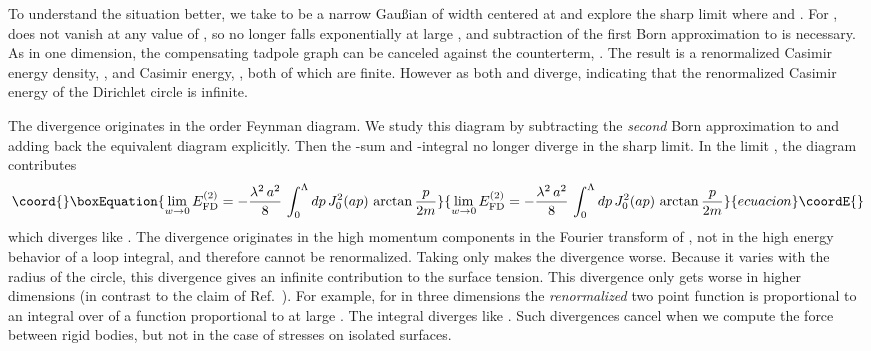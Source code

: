 \documentclass[a4paper,aps,amsfonts,prl,showpacs,nobibnotes,nofootinbib,%
tightenlines,twocolumn]{revtex4}
\providecommand{\vek}[1]{\mathbf{#1}}
\begin{document}
To understand the situation better, we take \myHighlight{$\sigma(\vek x)$}\coordHE{} to be a
narrow Gau{\ss}ian of width \coordHE{} centered at \coordHE{} and explore the
sharp limit where \coordHE{} and \myHighlight{$\sigma(\vek
x)\to\delta(r-a)$}\coordHE{}.  For \coordHE{}, \myHighlight{$\sigma$}\coordHE{} does not vanish at any
value of \coordHE{}, so \coordHE{} no longer falls exponentially
at large \coordHE{}, and subtraction of the first Born approximation to
\coordHE{} is necessary.  As in one dimension, the
compensating tadpole graph can be canceled against the counterterm,
\myHighlight{$c_{1}\lambda\sigma(\vek x)$}\coordHE{}.  The result is a renormalized Casimir
energy density, \coordHE{}, and Casimir energy,
\coordHE{}, both of
which are finite.  However as \coordHE{} both \coordHE{}
and \coordHE{} diverge, indicating that the renormalized Casimir
energy of the Dirichlet circle is infinite.

The divergence originates in the order \coordHE{}
Feynman diagram.  We study this diagram by subtracting the
\emph{second} Born approximation to \coordHE{} and adding back
the equivalent diagram explicitly.  Then the  \myHighlight{$\ell$}\coordHE{}-sum and
\coordHE{}-integral no longer diverge in the  sharp limit.  In
the limit \coordHE{}, the diagram contributes
\begin{equation}\coord{}\boxEquation{
\lim_{w\to 0}E_{\rm FD}^{(2)} = - \frac{\lambda^2\,a^2}{8}\,
\int_0^\Lambda dp\,J_0^2(a p)\,\arctan\frac{p}{2m}  
\label{B6}
}{
\lim_{w\to 0}E_{\rm FD}^{(2)} = - \frac{\lambda^2\,a^2}{8}\,
\int_0^\Lambda dp\,J_0^2(a p)\,\arctan\frac{p}{2m}  
}{ecuacion}\coordE{}\end{equation}
%
which diverges like \myHighlight{$\ln\Lambda$}\coordHE{}.  The divergence originates in the
high momentum components in the Fourier transform of
\coordHE{}, not in the high energy behavior of a
loop integral, and therefore cannot be renormalized.  Taking
\myHighlight{$\lambda\to\infty$}\coordHE{} only makes the divergence worse.  Because it varies
with the radius of the circle, this divergence gives an infinite
contribution to the surface tension.  This divergence only gets
worse in higher dimensions (in contrast to the claim of
Ref.~\cite{Milton}).  For example, for \coordHE{} in
three dimensions the \emph{renormalized} two point function is
proportional to an integral over \coordHE{} of a function proportional to
\coordHE{} at large \coordHE{}.  The
integral diverges like \myHighlight{$\Lambda\ln\Lambda$}\coordHE{}. Such divergences cancel
when we compute the force between rigid bodies, but not in the case of
stresses on isolated surfaces.
\end{document}
